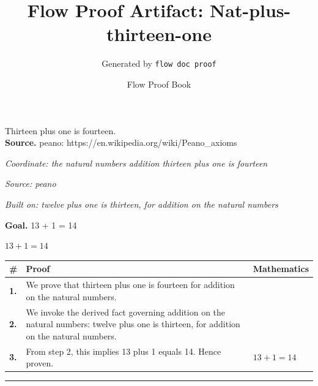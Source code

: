 \documentclass[11pt]{article}
\title{Flow Proof Artifact: Nat-plus-thirteen-one}
\author{Generated by \texttt{flow doc proof}}
\date{Flow Proof Book}
\theoremstyle{definition}
\begin{document}
\maketitle
Thirteen plus one is fourteen.\\[0.5em]
\textbf{Source.} peano: https://en.wikipedia.org/wiki/Peano\_axioms\\[0.5em]
\bigskip
{}\par
\smallskip\noindent\textit{Coordinate: the natural numbers \cdot addition \cdot thirteen plus one is fourteen}\par
\smallskip\noindent\textit{Source: peano}\par
\smallskip\noindent\textit{Built on: twelve plus one is thirteen, for addition on the natural numbers}\par
\medskip
\noindent\textbf{Goal.} 13 + 1 = 14\par
\noindent$\displaystyle 13 + 1 = 14$\par
\medskip
\noindent
\begin{tabular}{@{} >{\raggedright\arraybackslash}p{} >{\raggedright\arraybackslash}p{} >{\raggedleft\arraybackslash}p{} @{}}
\textbf{\#} & \textbf{Proof} & \textbf{Mathematics} \\
\midrule
\textbf{1.} & We prove that thirteen plus one is fourteen for addition on the natural numbers. & \\[0.45em]
\textbf{2.} & We invoke the derived fact governing addition on the natural numbers: twelve plus one is thirteen, for addition on the natural numbers. & \\[0.45em]
\textbf{3.} & From step 2, this implies 13 plus 1 equals 14. Hence proven. & $\displaystyle 13 + 1 = 14$ \\[0.45em]
\bottomrule
\end{tabular}
\label{thm:Nat-addition-thirteen_plus_one_is_fourteen}
\par\medskip\hrule
\end{document}
